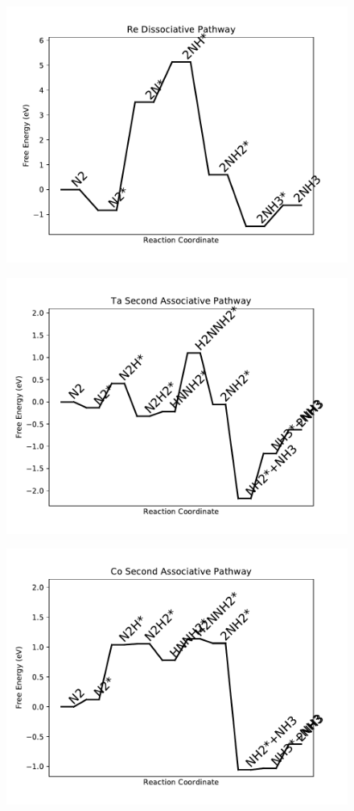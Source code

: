 \begin{figure}
\includegraphics[width=0.8\linewidth]{data/plots/Re_dissociative.pdf}
\label{fig:Re_dissociative}
\end{figure}

\begin{figure}
\includegraphics[width=0.8\linewidth]{data/plots/Ta_associative_2.pdf}
\label{fig:Ta_associative_2}
\end{figure}

\begin{figure}
\includegraphics[width=0.8\linewidth]{data/plots/Co_associative_2.pdf}
\label{fig:Co_associative_2}
\end{figure}

